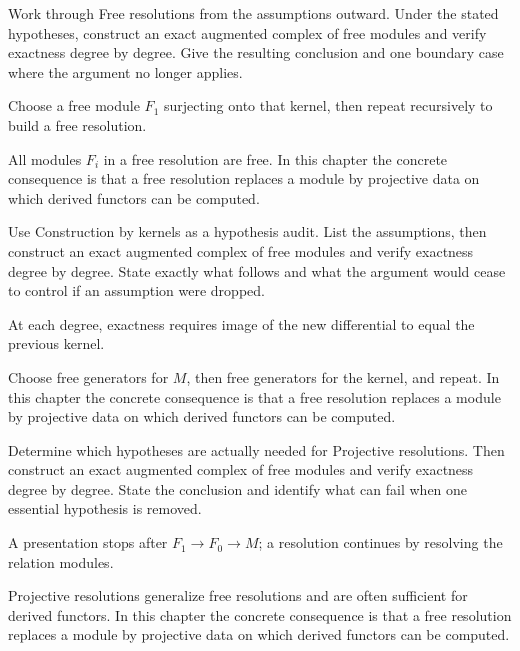 \begin{exercise}\label{exr:v23-02}
Work through Free resolutions from the assumptions outward. Under the stated hypotheses, construct an exact augmented complex of free modules and verify exactness degree by degree. Give the resulting conclusion and one boundary case where the argument no longer applies.
\end{exercise}
\begin{hint}
Choose a free module \(F_1\) surjecting onto that kernel, then repeat recursively to build a free resolution.
\end{hint}
\begin{solution}
All modules $F_i$ in a free resolution are free. In this chapter the concrete consequence is that a free resolution replaces a module by projective data on which derived functors can be computed.
\end{solution}

\begin{exercise}\label{exr:v23-03}
Use Construction by kernels as a hypothesis audit. List the assumptions, then construct an exact augmented complex of free modules and verify exactness degree by degree. State exactly what follows and what the argument would cease to control if an assumption were dropped.
\end{exercise}
\begin{hint}
At each degree, exactness requires image of the new differential to equal the previous kernel.
\end{hint}
\begin{solution}
Choose free generators for $M$, then free generators for the kernel, and repeat. In this chapter the concrete consequence is that a free resolution replaces a module by projective data on which derived functors can be computed.
\end{solution}

\begin{exercise}\label{exr:v23-04}
Determine which hypotheses are actually needed for Projective resolutions. Then construct an exact augmented complex of free modules and verify exactness degree by degree. State the conclusion and identify what can fail when one essential hypothesis is removed.
\end{exercise}
\begin{hint}
A presentation stops after \(F_1\to F_0\to M\); a resolution continues by resolving the relation modules.
\end{hint}
\begin{solution}
Projective resolutions generalize free resolutions and are often sufficient for derived functors. In this chapter the concrete consequence is that a free resolution replaces a module by projective data on which derived functors can be computed.
\end{solution}

